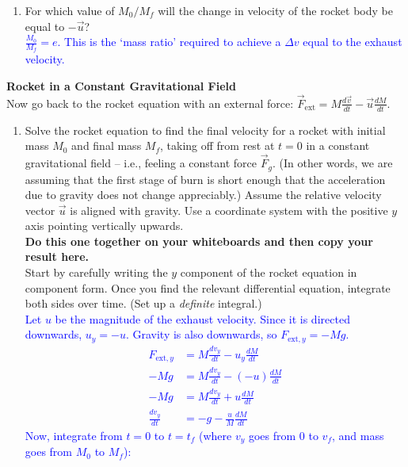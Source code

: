 \documentclass[11pt, letterpaper, openany]{book}
\newenvironment{exercise}[1][Exercise]{%
  \tcolorbox[blanker, breakable, left=1em,
    before skip=1em, after skip=1em,
    borderline west={3pt}{0pt}{PhysNavy},
    colback=PhysCream,
    before upper={\textcolor{PhysNavy}{\sffamily\bfseries #1:}\space}
  ]%
}{%
  \endtcolorbox%
}
\begin{document}
\begin{exercise}[Exercise 5]
\begin{enumerate}[label=(\alph*)]
    \item For which value of $M_0/M_f$ will the change in velocity of the rocket body be equal to $-\vec{u}$? \\
    \textcolor{blue}{$\frac{M_0}{M_f} = e$. This is the `mass ratio' required to achieve a $\Delta v$ equal to the exhaust velocity.}
\end{enumerate}
\end{exercise}

\begin{exercise}[Exercise 6]
\textbf{Rocket in a Constant Gravitational Field} \\
Now go back to the rocket equation with an external force: $\vec{F}_{\text{ext}} = M\frac{d\vec{v}}{dt} - \vec{u}\frac{dM}{dt}$.
\begin{enumerate}[label=(\alph*)]
    \item Solve the rocket equation to find the final velocity for a rocket with initial mass $M_0$ and final mass $M_f$, taking off from rest at $t=0$ in a constant gravitational field -- i.e., feeling a constant force $\vec{F}_g$. (In other words, we are assuming that the first stage of burn is short enough that the acceleration due to gravity does not change appreciably.) Assume the relative velocity vector $\vec{u}$ is aligned with gravity. Use a coordinate system with the positive $y$ axis pointing vertically upwards. \\
    \textbf{Do this one together on your whiteboards and then copy your result here.} \\
    Start by carefully writing the $y$ component of the rocket equation in component form. Once you find the relevant differential equation, integrate both sides over time. (Set up a \textit{definite} integral.) \\
    \textcolor{blue}{
    Let $u$ be the magnitude of the exhaust velocity. Since it is directed downwards, $u_y = -u$. Gravity is also downwards, so $F_{\text{ext}, y} = -Mg$.
    \begin{align*}
        F_{\text{ext}, y} &= M\frac{dv_y}{dt} - u_y\frac{dM}{dt} \\
        -Mg &= M\frac{dv_y}{dt} - (-u)\frac{dM}{dt} \\
        -Mg &= M\frac{dv_y}{dt} + u\frac{dM}{dt} \\
        \frac{dv_y}{dt} &= -g - \frac{u}{M}\frac{dM}{dt}
    \end{align*}
    Now, integrate from $t=0$ to $t=t_f$ (where $v_y$ goes from $0$ to $v_f$, and mass goes from $M_0$ to $M_f$):
    \begin{align*}

\end{align*}}
\end{enumerate}
\end{exercise}
\end{document}
